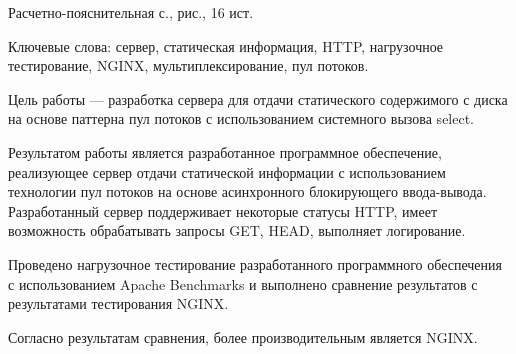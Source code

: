 
Расчетно-пояснительная \pageref{TotPages} с., \totalfigures{} рис., 16 ист.

Ключевые слова: сервер, статическая информация, HTTP, нагрузочное тестирование, NGINX, мультиплексирование, пул потоков.

Цель работы --- разработка сервера для отдачи статического содержимого с диска на основе паттерна пул потоков с использованием системного вызова select.

Результатом работы является разработанное программное обеспечение, реализующее сервер отдачи статической информации с использованием технологии пул потоков на основе асинхронного блокирующего ввода-вывода.
Разработанный сервер поддерживает некоторые статусы HTTP, имеет возможность обрабатывать запросы GET, HEAD, выполняет логирование.

Проведено нагрузочное тестирование разработанного программного обеспечения с использованием Apache Benchmarks и выполнено сравнение результатов с результатами тестирования NGINX.

Согласно результатам сравнения, более производительным является NGINX.
